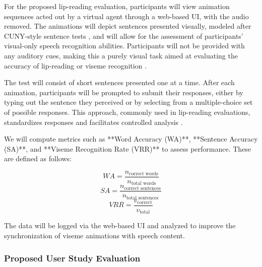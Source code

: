 \documentclass[12pt]{article}
\begin{document}
For the proposed lip-reading evaluation, participants will view animation sequences acted out by a virtual agent through a web-based UI, with the audio removed. The animations will depict sentences presented visually, modeled after CUNY-style sentence tests \cite{Altieri2011SomeL}, and will allow for the assessment of participants’ visual-only speech recognition abilities. Participants will not be provided with any auditory cues, making this a purely visual task aimed at evaluating the accuracy of lip-reading or viseme recognition \cite{Altieri2011SomeL}.

The test will consist of short sentences presented one at a time. After each animation, participants will be prompted to submit their responses, either by typing out the sentence they perceived or by selecting from a multiple-choice set of possible responses. This approach, commonly used in lip-reading evaluations, standardizes responses and facilitates controlled analysis \cite{Altieri2011SomeL}.

We will compute metrics such as **Word Accuracy (WA)**, **Sentence Accuracy (SA)**, and **Viseme Recognition Rate (VRR)** to assess performance. These are defined as follows:

\[
WA = \frac{n_{\text{correct words}}}{n_{\text{total words}}}
\]
\[
SA = \frac{n_{\text{correct sentences}}}{n_{\text{total sentences}}}
\]
\[
VRR = \frac{v_{\text{correct}}}{v_{\text{total}}}
\]

The data will be logged via the web-based UI and analyzed to improve the synchronization of viseme animations with speech content.

\subsubsection{Proposed User Study Evaluation}



\end{document}
